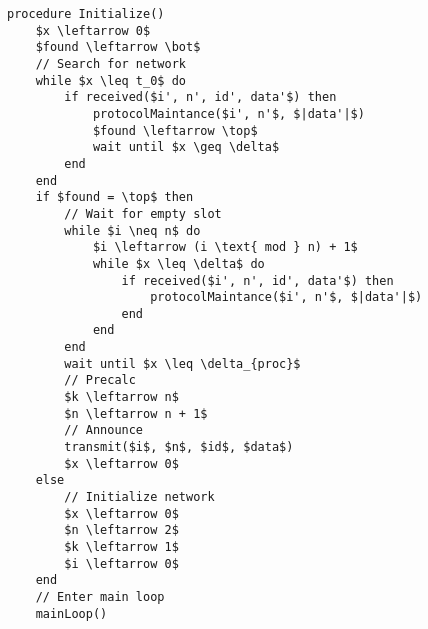 \begin{minipage}{\linewidth} %
\begin{lstlisting}[label=lst:setupCCRC,style=pseudocode,mathescape=true,caption={Pseudocode example of the special case procedure Initialize()},basicstyle=\ttfamily]
procedure Initialize()
	$x \leftarrow 0$
	$found \leftarrow \bot$
	// Search for network
	while $x \leq t_0$ do
		if received($i', n', id', data'$) then
			protocolMaintance($i', n'$, $|data'|$)
			$found \leftarrow \top$
			wait until $x \geq \delta$
		end
	end	
	if $found = \top$ then
		// Wait for empty slot
		while $i \neq n$ do
			$i \leftarrow (i \text{ mod } n) + 1$
			while $x \leq \delta$ do
				if received($i', n', id', data'$) then
					protocolMaintance($i', n'$, $|data'|$)
				end
			end
		end
		wait until $x \leq \delta_{proc}$
		// Precalc
		$k \leftarrow n$
		$n \leftarrow n + 1$
		// Announce
		transmit($i$, $n$, $id$, $data$)
		$x \leftarrow 0$
	else
		// Initialize network
		$x \leftarrow 0$
		$n \leftarrow 2$
		$k \leftarrow 1$
		$i \leftarrow 0$
	end
	// Enter main loop
	mainLoop()
\end{lstlisting}   
\end{minipage}
